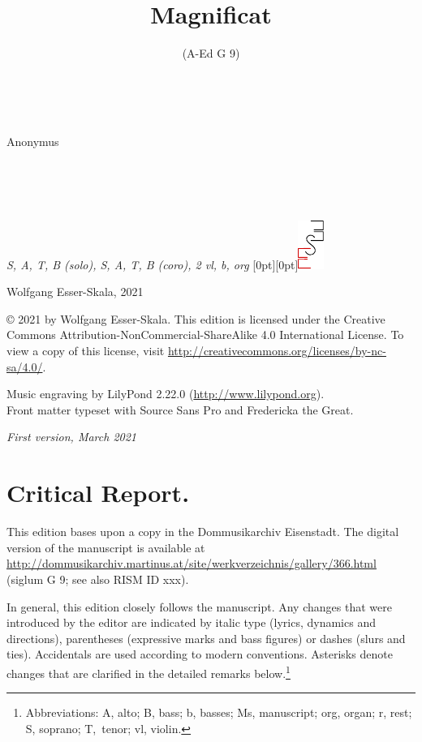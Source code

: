 \documentclass[parskip=full]{scrreprt}
\makeatletter
\DeclareRobustCommand{\sbseries}{\fontseries{sb}\selectfont}
\newcommand\fancytitlehead{
	\headingfont%
	\fontsize{80}{80}\selectfont\textcolor{black!80}{\@ifundefined{@shortname}{\@lastname}{\@shortname}.}\\[15pt]%
	\fontsize{60}{60}\selectfont\@ifundefined{@shorttitle}{\@title}{\@shorttitle}.%
}
\def\lastname#1{\def\@lastname{#1}}
\def\instrumentation#1{\def\@instrumentation{#1}}
\def\maketitle{%
\begin{titlepage}%
	\Large%
	{\@titlehead}%
	\vfill%
	{\strut\@firstname}\\%
	{\sbseries\color{oldred}\strut\@lastname}\\%
	{\strut\@namesuffix}%
	\vfill%
	{\sbseries\@title}\\%
	{\@subtitle}\\[\baselineskip]%
	{\itshape\@instrumentation}%
	\vfill%
	{\itshape\@parts}\hspace*{\fill}\raisebox{0pt}[0pt][0pt]{\includegraphics{ees_logo}}%
\end{titlepage}%
}
\newif\ifprintreport\printreportfalse
\makeatother
\begin{document}
\frenchspacing

\titlehead{\fancytitlehead}
\lastname{Anonymus}
\title{Magnificat}
\subtitle{(A-Ed G 9)}
\instrumentation{S, A, T, B (solo), S, A, T, B (coro), 2 vl, b, org}
\maketitle


\thispagestyle{empty}

\vspace*{\fill}

\hspace*{1em}Wolfgang Esser-Skala, 2021

© 2021 by Wolfgang Esser-Skala. This edition is licensed under the Creative Commons Attribution-NonCommercial-ShareAlike 4.0 International License. To view a copy of this license, visit \url{http://creativecommons.org/licenses/by-nc-sa/4.0/}. 

Music engraving by LilyPond 2.22.0 (\url{http://www.lilypond.org}).\\
Front matter typeset with Source Sans Pro and Fredericka the Great.

\textit{First version, March 2021}

\vspace*{2cm}

\ifprintreport
\chapter*{Critical Report.}

This edition bases upon a copy in the Dommusikarchiv Eisenstadt. The digital version of the manuscript is available at \url{http://dommusikarchiv.martinus.at/site/werkverzeichnis/gallery/366.html} (siglum G 9; see also RISM ID xxx).

In general, this edition closely follows the manuscript. Any changes that were introduced by the editor are indicated by italic type (lyrics, dynamics and directions), parentheses (expressive marks and bass figures) or dashes (slurs and ties). Accidentals are used according to modern conventions. Asterisks denote changes that are clarified in the detailed remarks below.\footnote{Abbreviations: A, alto; B, bass; b, basses; Ms, manuscript; org, organ; r, rest; S, soprano; T,~tenor; vl, violin.}
\end{document}
